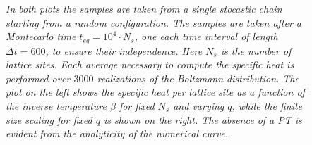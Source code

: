 \documentclass[aps,pra,superscriptaddress]{revtex4}
\renewcommand{\(}{\left(}
\renewcommand{\)}{\right)}
\renewcommand{\[}{\left[}
\renewcommand{\]}{\right]}
\begin{document}
\begin{figure}[H]
\center
{}
\caption{{\em In both plots the samples are taken from a single stocastic chain starting from a random configuration. The samples are taken after a Montecarlo time $t_{eq} = 10^4 \cdot N_s$, one each time interval of length $\Delta t = 600$, to ensure their independence. Here $N_s$ is the number of lattice sites. Each average necessary to compute the specific heat is performed over $3000$ realizations of the Boltzmann distribution. The plot on the left shows the specific heat per lattice site as a function of the inverse temperature $\beta$ for fixed $N_s$ and varying $q$, while the finite size scaling for fixed $q$ is shown on the right. The absence of a PT is evident from the analyticity of the numerical curve.     }}
\label{specheat}
\end{figure}
 
\end{document}
